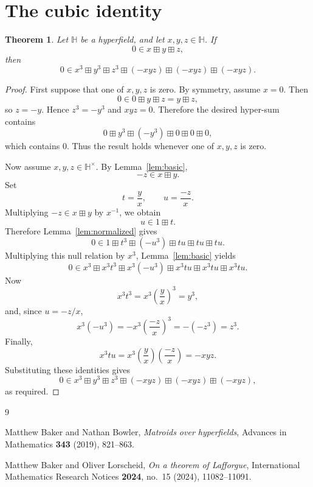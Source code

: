 \documentclass[11pt]{article}
\newtheorem{theorem}{Theorem}
\theoremstyle{remark}
\begin{document}
\section{The cubic identity}

\begin{theorem}
Let \(\mathbb H\) be a hyperfield, and let \(x,y,z\in \mathbb H\). If
\[
0\in x\boxplus y\boxplus z,
\]
then
\[
0\in
x^3\boxplus y^3\boxplus z^3
\boxplus(-xyz)\boxplus(-xyz)\boxplus(-xyz).
\]
\end{theorem}

\begin{proof}
First suppose that one of \(x,y,z\) is zero. By symmetry, assume \(x=0\). Then
\[
0\in 0\boxplus y\boxplus z=y\boxplus z,
\]
so \(z=-y\). Hence \(z^3=-y^3\) and \(xyz=0\). Therefore the desired hyper-sum
contains
\[
0\boxplus y^3\boxplus(-y^3)\boxplus 0\boxplus0\boxplus0,
\]
which contains \(0\). Thus the result holds whenever one of \(x,y,z\) is zero.

Now assume \(x,y,z\in\mathbb H^\times\). By Lemma~\ref{lem:basic},
\[
-z\in x\boxplus y.
\]
Set
\[
t=\frac{y}{x},
\qquad
u=\frac{-z}{x}.
\]
Multiplying \(-z\in x\boxplus y\) by \(x^{-1}\), we obtain
\[
u\in 1\boxplus t.
\]
Therefore Lemma~\ref{lem:normalized} gives
\[
0\in
1\boxplus t^3\boxplus(-u^3)
\boxplus tu\boxplus tu\boxplus tu.
\]
Multiplying this null relation by \(x^3\), Lemma~\ref{lem:basic} yields
\[
0\in
x^3
\boxplus x^3t^3
\boxplus x^3(-u^3)
\boxplus x^3tu
\boxplus x^3tu
\boxplus x^3tu.
\]
Now
\[
x^3t^3=x^3\left(\frac{y}{x}\right)^3=y^3,
\]
and, since \(u=-z/x\),
\[
x^3(-u^3)
=
-x^3\left(\frac{-z}{x}\right)^3
=
-(-z^3)
=
z^3.
\]
Finally,
\[
x^3tu
=
x^3\left(\frac{y}{x}\right)\left(\frac{-z}{x}\right)
=
-xyz.
\]
Substituting these identities gives
\[
0\in
x^3\boxplus y^3\boxplus z^3
\boxplus(-xyz)\boxplus(-xyz)\boxplus(-xyz),
\]
as required.
\end{proof}

\begin{thebibliography}{9}

Matthew Baker and Nathan Bowler,
\emph{Matroids over hyperfields},
Advances in Mathematics \textbf{343} (2019), 821--863.

Matthew Baker and Oliver Lorscheid,
\emph{On a theorem of Lafforgue},
International Mathematics Research Notices \textbf{2024}, no.~15 (2024), 11082--11091.

\end{thebibliography}
\end{document}
